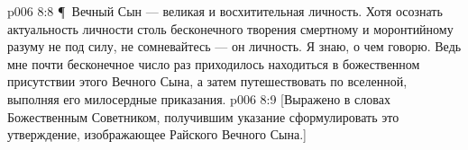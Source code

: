\vs p006 8:8 \P\ Вечный Сын --- великая и восхитительная личность. Хотя осознать актуальность личности столь бесконечного творения смертному и моронтийному разуму не под силу, не сомневайтесь --- он личность. Я знаю, о чем говорю. Ведь мне почти бесконечное число раз приходилось находиться в божественном присутствии этого Вечного Сына, а затем путешествовать по вселенной, выполняя его милосердные приказания.
\vs p006 8:9 [Выражено в словах Божественным Советником, получившим указание сформулировать это утверждение, изображающее Райского Вечного Сына.]
